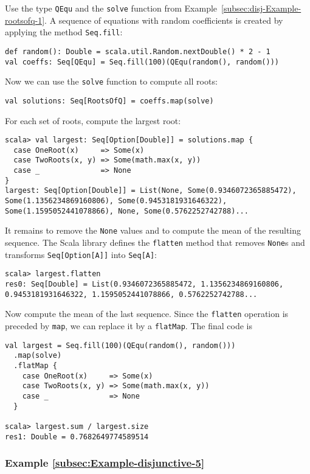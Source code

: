 Use the type \lstinline!QEqu! and the \lstinline!solve! function
from Example~\ref{subsec:disj-Example-rootsofq-1}. A sequence of
equations with random coefficients is created by applying the method
\lstinline!Seq.fill!:
\begin{lstlisting}
def random(): Double = scala.util.Random.nextDouble() * 2 - 1
val coeffs: Seq[QEqu] = Seq.fill(100)(QEqu(random(), random()))
\end{lstlisting}
Now we can use the \lstinline!solve! function to compute all roots:
\begin{lstlisting}
val solutions: Seq[RootsOfQ] = coeffs.map(solve)
\end{lstlisting}
For each set of roots, compute the largest root:
\begin{lstlisting}
scala> val largest: Seq[Option[Double]] = solutions.map {
  case OneRoot(x)     => Some(x)
  case TwoRoots(x, y) => Some(math.max(x, y))
  case _              => None
}
largest: Seq[Option[Double]] = List(None, Some(0.9346072365885472), Some(1.1356234869160806), Some(0.9453181931646322), Some(1.1595052441078866), None, Some(0.5762252742788)...
\end{lstlisting}
It remains to remove the \lstinline!None! values and to compute the
mean of the resulting sequence. The Scala library defines the \lstinline!flatten!
method that removes \lstinline!None!s and transforms \lstinline!Seq[Option[A]]!
into \lstinline!Seq[A]!:
\begin{lstlisting}
scala> largest.flatten
res0: Seq[Double] = List(0.9346072365885472, 1.1356234869160806, 0.9453181931646322, 1.1595052441078866, 0.5762252742788...
\end{lstlisting}
Now compute the mean of the last sequence. Since the \lstinline!flatten!
operation is preceded by \lstinline!map!, we can replace it by a
\lstinline!flatMap!. The final code is
\begin{lstlisting}
val largest = Seq.fill(100)(QEqu(random(), random()))
  .map(solve)
  .flatMap {
    case OneRoot(x)     => Some(x)
    case TwoRoots(x, y) => Some(math.max(x, y))
    case _              => None
  }

scala> largest.sum / largest.size
res1: Double = 0.7682649774589514
\end{lstlisting}


\subsubsection{Example \label{subsec:Example-disjunctive-5}\ref{subsec:Example-disjunctive-5}}

